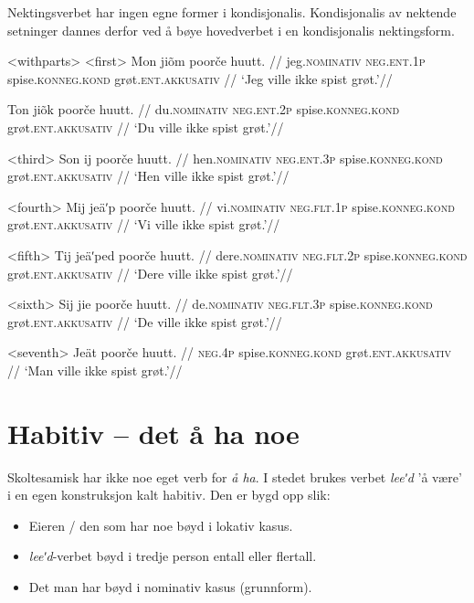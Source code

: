 Nektingsverbet har ingen egne former i kondisjonalis. Kondisjonalis av nektende setninger dannes derfor ved å bøye hovedverbet i en kondisjonalis nektingsform.

\pex<withparts> %
\a<first> %
\begingl %
\gla Mon jiõm poorče huutt. //
\glb jeg.\textsc{nominativ} \textsc{neg.ent.1p} spise.\textsc{konneg.kond} grøt.\textsc{ent.akkusativ} //
\glft `Jeg ville ikke spist grøt.'//
\endgl

\begingl %
\gla Ton jiõk poorče huutt. //
\glb du.\textsc{nominativ} \textsc{neg.ent.2p} spise.\textsc{konneg.kond} grøt.\textsc{ent.akkusativ} //
\glft `Du ville ikke spist grøt.'//
\endgl

\a<third>
\begingl %
\gla Son ij poorče huutt. //
\glb hen.\textsc{nominativ} \textsc{neg.ent.3p} spise.\textsc{konneg.kond} grøt.\textsc{ent.akkusativ} //
\glft `Hen ville ikke spist grøt.'//
\endgl

\a<fourth>
\begingl %
\gla Mij jeäʹp poorče huutt. //
\glb vi.\textsc{nominativ} \textsc{neg.flt.1p} spise.\textsc{konneg.kond} grøt.\textsc{ent.akkusativ} //
\glft `Vi ville ikke spist grøt.'//
\endgl

\a<fifth>
\begingl %
\gla Tij jeäʹped poorče huutt. //
\glb dere.\textsc{nominativ} \textsc{neg.flt.2p} spise.\textsc{konneg.kond} grøt.\textsc{ent.akkusativ} //
\glft `Dere ville ikke spist grøt.'//
\endgl

\a<sixth>
\begingl %
\gla Sij jie poorče huutt. //
\glb de.\textsc{nominativ} \textsc{neg.flt.3p} spise.\textsc{konneg.kond} grøt.\textsc{ent.akkusativ} //
\glft `De ville ikke spist grøt.'//
\endgl

\a<seventh>
\begingl %
\gla Jeät poorče huutt. //
\glb \textsc{neg.4p} spise.\textsc{konneg.kond} grøt.\textsc{ent.akkusativ} //
\glft `Man ville ikke spist grøt.'//
\endgl

\xe

\section{Habitiv – det å ha noe}

Skoltesamisk har ikke noe eget verb for \textit{å ha}. I stedet brukes verbet \textit{leeʹd} 'å være' i en egen konstruksjon kalt habitiv. Den er bygd opp slik:

\begin{itemize}
	\item Eieren / den som har noe bøyd i lokativ kasus.
	\item \textit{leeʹd}-verbet bøyd i tredje person entall eller flertall.
	\item Det man har bøyd i nominativ kasus (grunnform).
\end{itemize}

